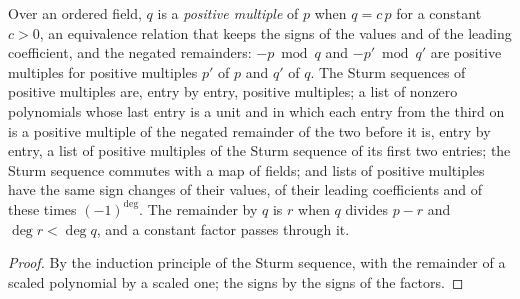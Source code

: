 \begin{lemma}\label{lem:posAssoc}
  \leanok
  Over an ordered field, $q$ is a \emph{positive multiple} of $p$ when $q = c\,p$ for a constant
  $c > 0$, an equivalence relation that keeps the signs of the values and of the leading
  coefficient, and the negated remainders: $-p \bmod q$ and $-p' \bmod q'$ are positive multiples
  for positive multiples $p'$ of $p$ and $q'$ of $q$. The Sturm sequences of positive multiples are,
  entry by entry, positive multiples; a list of nonzero polynomials whose last entry is a unit and
  in which each entry from the third on is a positive multiple of the negated remainder of the two
  before it is, entry by entry, a list of positive multiples of the Sturm sequence of its first two
  entries; the Sturm sequence commutes with a map of fields; and lists of positive multiples have
  the same sign changes of their values, of their leading coefficients and of these times
  $(-1)^{\deg}$. The remainder by $q$ is $r$ when $q$ divides $p - r$ and $\deg r < \deg q$, and a
  constant factor passes through it.
\end{lemma}

\begin{proof}\leanok
  By the induction principle of the Sturm sequence, with the remainder of a scaled polynomial by a
  scaled one; the signs by the signs of the factors.
\end{proof}

